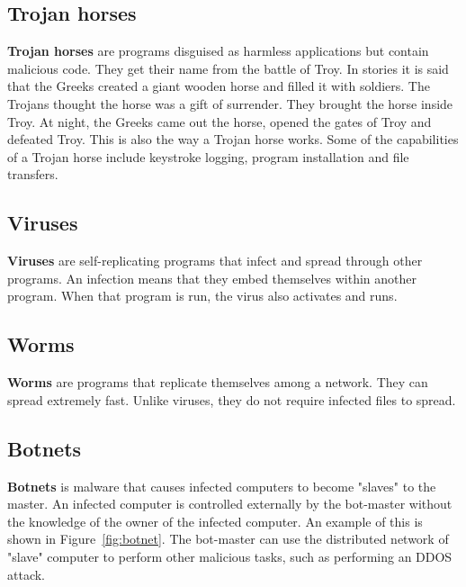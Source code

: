 \subsection{Trojan horses}
\textbf{Trojan horses} are programs disguised as harmless applications but contain malicious code. They get their name from the battle of Troy. In stories it is said that the Greeks created a giant wooden horse and filled it with soldiers. The Trojans thought the horse was a gift of surrender. They brought the horse inside Troy. At night, the Greeks came out the horse, opened the gates of Troy and defeated Troy. This is also the way a Trojan horse works. Some of the capabilities of a Trojan horse include keystroke logging, program installation and file transfers. \cite{hansman2005taxonomy}

\subsection{Viruses}
\textbf{Viruses} are self-replicating programs that infect and spread through other programs. An infection means that they embed themselves within another program. When that program is run, the virus also activates and runs. \cite{hansman2005taxonomy}

\subsection{Worms}
\textbf{Worms} are programs that replicate themselves among a network.  They can spread extremely fast. Unlike viruses, they do not require infected files to spread. \cite{hansman2005taxonomy}

\subsection{Botnets}
\textbf{Botnets} is malware that causes infected computers to become "slaves" to the master. An infected computer is controlled externally by the bot-master without the knowledge of the owner of the infected computer. An example of this is shown in Figure~\ref{fig:botnet}. The bot-master can use the distributed network of "slave" computer to perform other malicious tasks, such as performing an DDOS attack. \cite{IPFlow}

